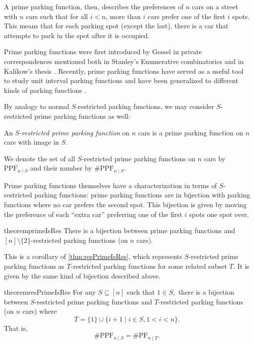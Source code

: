 \documentclass[12pt]{article}
\begin{document}
A prime parking function, then, describes the preferences of $n$ cars on a street with $n$ cars such that for all $i < n$, more than $i$ cars prefer one of the first $i$ spots. This means that for each parking spot (except the last), there is a car that attempts to park in the spot after it is occupied.

Prime parking functions were first introduced by Gessel in private correspondences mentioned both in Stanley’s Enumerative combinatorics \cite{stanley-fomin-1999} and in Kalikow’s thesis \cite{kalikow-1999}. Recently, prime parking functions have served as a useful tool to study unit interval parking functions \cite{meyles-2023} and have been generalized to different kinds of parking functions \cite{armon-2024}.

By analogy to normal $S$-restricted parking functions, we may consider $S$-restricted prime parking functions as well:

\begin{definition}
    An \emph{$S$-restricted prime parking function} on $n$ cars is a prime parking function on $n$ cars with image in $S$.

    We denote the set of all $S$-restricted prime parking functions on $n$ cars by $\mathrm{PPF}_{n \mid S}$ and their number by $\# \mathrm{P P F}_{n \mid S}$.
\end{definition}

Prime parking functions themselves have a characterization in terms of $S$-restricted parking functions: prime parking functions are in bijection with parking functions where no car prefers the second spot. This bijection is given by moving the preference of each ``extra car'' preferring one of the first $i$ spots one spot over.

\begin{restatable}{theorem}{primeIsRes}
    \label{thm:primeIsRes}
	There is a bijection between prime parking functions and $[n] \setminus \{ 2 \}$-restricted parking functions (on $n$ cars). 
\end{restatable}

This is a corollary of \cref{thm:resPrimeIsRes}, which represents $S$-restricted prime parking functions as $T$-restricted parking functions for some related subset $T$. It is given by the same kind of bijection described above.

\begin{restatable}{theorem}{resPrimeIsRes}
    \label{thm:resPrimeIsRes}
	For any $S\subseteq [n]$ such that $1\in S,$  there is a bijection between $S$-restricted prime parking functions and $T$-restricted parking functions (on $n$ cars) where
	\[
		T = \{ 1 \} \cup \{ i + 1 \mid i \in S, 1 < i < n \}.
	\]
	That is,
	\[
		\# \mathrm{PPF}_{n \mid S} = \# \mathrm{PF}_{n \mid T}.
	\]
\end{restatable}
\end{document}
